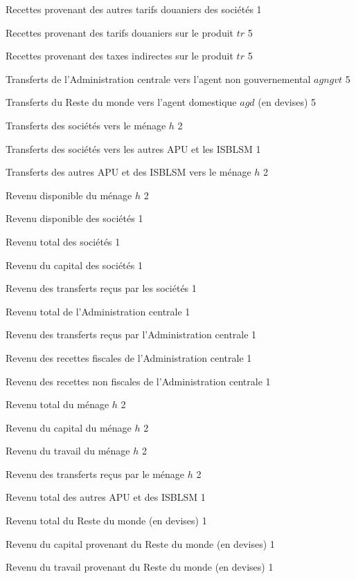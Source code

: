\documentclass[11pt,a4paper]{article}
\newcommand{\agd}{\mathit{agd}}
\newcommand{\agngvt}{\mathit{agngvt}}
\newcommand{\firm}{\mathsf{firm}}
\newcommand{\gvt}{\mathsf{gvt}}
\newcommand{\ngo}{\mathsf{ngo}}
\newcommand{\row}{\mathsf{row}}
\newcommand{\tr}{\mathit{tr}}
\newcommand{\TI}{\mathit{TI}}
\newcommand{\TIM}{\mathit{TIM}}
\newcommand{\TIMF}{\mathit{TIMF}}
\newcommand{\TRA}{\mathit{TRA}}
\newcommand{\YDF}{\mathit{YDF}}
\newcommand{\YDH}{\mathit{YDH}}
\newcommand{\YF}{\mathit{YF}}
\newcommand{\YFK}{\mathit{YFK}}
\newcommand{\YFTR}{\mathit{YFTRA}}
\newcommand{\YG}{\mathit{YG}}
\newcommand{\YGNTX}{\mathit{YGNTX}}
\newcommand{\YGTR}{\mathit{YGTRA}}
\newcommand{\YGTX}{\mathit{YGTX}}
\newcommand{\YH}{\mathit{YH}}
\newcommand{\YHK}{\mathit{YHK}}
\newcommand{\YHL}{\mathit{YHL}}
\newcommand{\YHTR}{\mathit{YHTRA}}
\newcommand{\YNG}{\mathit{YNG}}
\newcommand{\YROW}{\mathit{YROW}}
\newcommand{\YROWK}{\mathit{YROWK}}
\newcommand{\YROWL}{\mathit{YROWL}}
\begin{document}
\begin{description}[leftmargin=!,labelwidth=\widthof{\bfseries AAAAAAAA},parsep=9.7pt]
		\item[$\TIMF$]	Recettes provenant des autres tarifs douaniers des sociétés 		\hfill 1
		\item[$\TIM_{\tr}$]	Recettes provenant des tarifs douaniers sur le produit $\tr$ 	\hfill 5
		\item[$\TI_{\tr}$]	Recettes provenant des taxes indirectes sur le produit $\tr$ 	\hfill 5%
		\item[$\TRA_{\agngvt,\gvt}$]   Transferts de l'Administration centrale vers l'agent non gouvernemental  $\agngvt$			\hfill 5
		\item[$\TRA_{\agd,\row}$]   Transferts du Reste du monde vers l'agent domestique  $\agd$ (en devises) 			\hfill 5
		\item[$\TRA_{h,\firm}$]   Transferts des sociétés vers le ménage    $h$			\hfill 2
		\item[$\TRA_{\ngo,\firm}$]   Transferts des sociétés vers les autres APU et les ISBLSM   			\hfill 1
		\item[$\TRA_{h,\ngo}$]   Transferts des autres APU et des ISBLSM vers le ménage $h$ \hfill 2
		\item[$\YDH_h$]	Revenu disponible du ménage $h$ 	\hfill 2
		\item[$\YDF$]	Revenu disponible des sociétés	 	\hfill 1
		\item[$\YF$]	Revenu total des sociétés 			\hfill 1
		\item[$\YFK$]	Revenu du capital des sociétés 		\hfill 1%
		\item[$\YFTR$]	Revenu des transferts reçus par les sociétés 	\hfill 1
		\item[$\YG$]	Revenu total de l'Administration centrale 		\hfill 1%
		\item[$\YGTR$]	Revenu des transferts reçus par l'Administration centrale 	\hfill 1
		\item[$\YGTX$]	Revenu des recettes fiscales de l'Administration centrale 	\hfill 1%
		\item[$\YGNTX$]	Revenu des recettes non fiscales de l'Administration centrale 	\hfill 1%
		\item[$\YH_h$]	Revenu total du ménage $h$ 			\hfill 2
		\item[$\YHK_h$]	Revenu du capital du ménage $h$ 	\hfill 2
		\item[$\YHL_h$]	Revenu du travail du ménage $h$ 	\hfill 2%
		\item[$\YHTR_h$]Revenu des transferts reçus par le ménage $h$ 	\hfill 2
		\item[$\YNG$]	Revenu total des autres APU et des ISBLSM		\hfill 1
		\item[$\YROW$]	Revenu total du Reste du monde	(en devises)				\hfill 1
		\item[$\YROWK$]	Revenu du capital provenant du Reste du monde (en devises)	\hfill 1
		\item[$\YROWL$]	Revenu du travail provenant du Reste du monde (en devises)	\hfill 1%
	\end{description}
	
\end{document}
